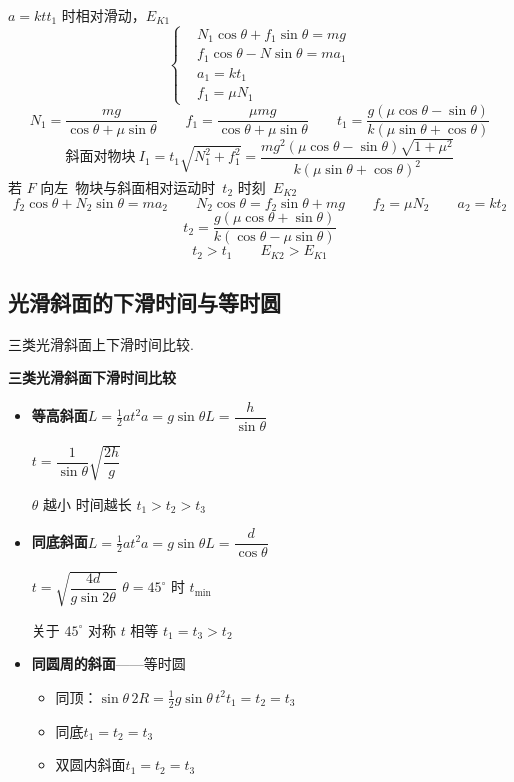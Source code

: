 $a=kt$\quad $t_1$ 时相对滑动，$E_{K1}$
\[
\left\{\begin{aligned}
&N_1\cos\theta+f_1\sin\theta=mg\\
&f_1\cos\theta-N\sin\theta=ma_1 %
\\
&a_1=kt_1\\
&f_1=\mu N_1
\end{aligned}\right.
\]
\[
N_1=\frac{mg}{\cos\theta+\mu\sin\theta}\qquad f_1=\frac{\mu mg}{\cos\theta+\mu\sin\theta}\qquad t_1=\frac{g(\mu\cos\theta-\sin\theta)}{k(\mu\sin\theta+\cos\theta)}
\]
\[
\text{斜面对物块}\ I_1=t_1\sqrt{N_1^2+f_1^2}=\frac{mg^2(\mu\cos\theta-\sin\theta)\sqrt{1+\mu^2}}{k(\mu\sin\theta+\cos\theta)^2}
\]
若 $F$ 向左\ 物块与斜面相对运动时\ $t_2$ 时刻\ $E_{K2}$
\[
f_2\cos\theta+N_2\sin\theta=ma_2\qquad N_2\cos\theta=f_2\sin\theta+mg\qquad f_2=\mu N_2\qquad a_2=kt_2
\]
\[
t_2=\frac{g(\mu\cos\theta+\sin\theta)}{k(\cos\theta-\mu\sin\theta)}
\]
\[
t_2>t_1\qquad E_{K2}>E_{K1}
\]

\subsection{光滑斜面的下滑时间与等时圆}
三类光滑斜面上下滑时间比较.

\textbf{三类光滑斜面下滑时间比较}
\begin{itemize}
\item \textbf{等高斜面}\quad $L=\frac12at^2$\quad $a=g\sin\theta$\quad $L=\dfrac{h}{\sin\theta}$

$t=\dfrac{1}{\sin\theta}\sqrt{\dfrac{2h}{g}}$

$\theta$ 越小 时间越长
$t_1>t_2>t_3$
\item \textbf{同底斜面}\quad $L=\frac12at^2$\quad $a=g\sin\theta$\quad $L=\dfrac{d}{\cos\theta}$

$t=\sqrt{\dfrac{4d}{g\sin2\theta}}$
$\theta=45^\circ$ 时 $t_{\min}$

关于 $45^\circ$ 对称 $t$ 相等
$t_1=t_3>t_2$
\item \textbf{同圆周的斜面}——等时圆
\begin{itemize}
\item 同顶：$\sin\theta\,2R=\frac12g\sin\theta\,t^2$\quad $t_1=t_2=t_3$
\item 同底\quad $t_1=t_2=t_3$
\item 双圆内斜面\quad $t_1=t_2=t_3$
\end{itemize}
\end{itemize}


